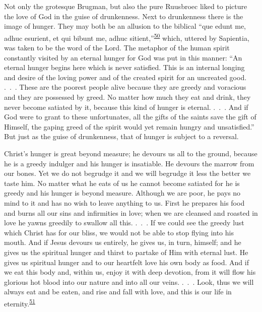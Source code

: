 Not only the grotesque Brugman, but also the pure Ruusbroec liked to
picture the love of God in the guise of drunkenness. Next to drunkenness
there is the image of hunger. They may both be an allusion to the
biblical ``que edunt me, adhuc esurient, et qui bibunt me, adhuc
sitient,''\textsuperscript{\protect\hypertarget{15_Chapter_Eight__RELIGIOUS_EXCITAT.xhtmlux5cux23id_808}{\protect\hyperlink{23_NOTES.xhtmlux5cux23id_809}{50}}}
which, uttered by Sapientia, was taken to be the word of the Lord. The
metaphor of the human spirit constantly visited by an eternal hunger for
God was put in this manner: ``An eternal hunger begins here which is
never satisfied. This is an internal longing and desire of the loving
power and of the created spirit for an uncreated good. .~.~. These are
the poorest people alive because they are greedy and voracious and they
are possessed by greed. No matter how much they eat and drink, they
never become satiated by it, because this kind of hunger is eternal.
.~.~. And if God were to grant to these unfortunates, all the gifts of
the saints save the gift of Himself, the gaping greed of the spirit
would yet remain hungry and unsatisfied.'' But just as the guise of
drunkenness, that of hunger is subject to a reversal.

Christ's hunger is great beyond measure; he devours us all to the
ground, because he is a greedy indulger and his hunger is insatiable. He
devours the marrow from our
\protect\hypertarget{15_Chapter_Eight__RELIGIOUS_EXCITAT.xhtmlux5cux23page_231}{}{}bones.
Yet we do not begrudge it and we will begrudge it less the better we
taste him. No matter what he eats of us he cannot become satiated for he
is greedy and his hunger is beyond measure. Although we are poor, he
pays no mind to it and has no wish to leave anything to us. First he
prepares his food and burns all our sins and infirmities in love; when
we are cleansed and roasted in love he yawns greedily to swallow all
this. .~.~. If we could see the greedy lust which Christ has for our
bliss, we would not be able to stop flying into his mouth. And if Jesus
devours us entirely, he gives us, in turn, himself; and he gives us the
spiritual hunger and thirst to partake of Him with eternal lust. He
gives us spiritual hunger and to our heartfelt love his own body as
food. And if we eat this body and, within us, enjoy it with deep
devotion, from it will flow his glorious hot blood into our nature and
into all our veins. .~.~. Look, thus we will always eat and be eaten,
and rise and fall with love, and this is our life in
eternity.\textsuperscript{\protect\hypertarget{15_Chapter_Eight__RELIGIOUS_EXCITAT.xhtmlux5cux23id_806}{\protect\hyperlink{23_NOTES.xhtmlux5cux23id_807}{51}}}

